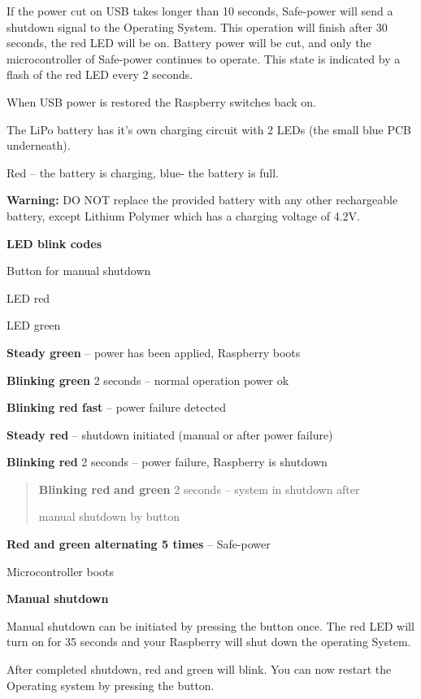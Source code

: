 \documentclass{article}
\begin{document}
If the power cut on USB takes longer than 10 seconds, Safe-power will
send a shutdown signal to the Operating System. This operation will
finish after 30 seconds, the red LED will be on. Battery power will be
cut, and only the microcontroller of Safe-power continues to operate.
This state is indicated by a flash of the red LED every 2 seconds.

When USB power is restored the Raspberry switches back on.

The LiPo battery has it's own charging circuit with 2 LEDs (the small
blue PCB underneath).

Red -- the battery is charging, blue- the battery is full.

\textbf{Warning:} DO NOT replace the provided battery with any other
rechargeable battery, except Lithium Polymer which has a charging
voltage of 4.2V.

\textbf{LED blink codes }




Button for manual shutdown

LED red

LED green

\textbf{Steady green} -- power has been applied, Raspberry boots

\textbf{Blinking green} 2 seconds -- normal operation power ok

\textbf{Blinking red fast} -- power failure detected

\textbf{Steady red} -- shutdown initiated (manual or after power
failure)

\textbf{Blinking red} 2 seconds -- power failure, Raspberry is shutdown

\begin{quote}
\textbf{Blinking red} \textbf{and green} 2 seconds -- system in shutdown
after

manual shutdown by button
\end{quote}

\textbf{Red and green alternating 5 times} -- Safe-power

Microcontroller boots

\textbf{Manual shutdown}

Manual shutdown can be initiated by pressing the button once. The red
LED will turn on for 35 seconds and your Raspberry will shut down the
operating System.

After completed shutdown, red and green will blink. You can now restart
the Operating system by pressing the button.
\end{document}
